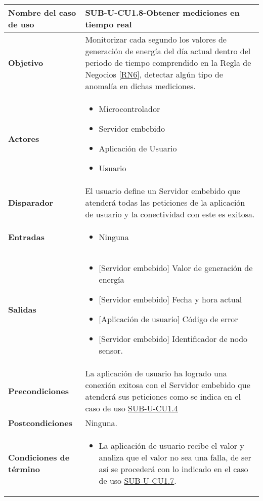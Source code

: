 \begin{longtable}{|J{5cm}|J{10.3cm}|}
	\hline
	\textbf{Nombre del caso de uso} &
		SUB-U-CU1.8-Obtener mediciones en tiempo real \\ \hline
	\textbf{Objetivo} &
		Monitorizar cada segundo los valores de generación de energía del día actual dentro del periodo de tiempo comprendido en la Regla de Negocios \ref{RN6}, detectar algún tipo de anomalía en dichas mediciones. \\ \hline
	\textbf{Actores} &
		\begin{itemize}
		    \item Microcontrolador
			\item Servidor embebido
			\item Aplicación de Usuario
		    \item Usuario
		\end{itemize} \\ \hline
	\textbf{Disparador} & 
	    El usuario define un Servidor embebido que atenderá todas las peticiones de la aplicación de usuario y la conectividad con este es exitosa.\\ \hline 
	\textbf{Entradas} & 
		\begin{itemize}
				\item Ninguna
		\end{itemize}\\ \hline 
	\textbf{Salidas} & 
		\begin{itemize}
			\item{[Servidor embebido]} Valor de generación de energía
			\item{[Servidor embebido]} Fecha y hora actual
			\item{[Aplicación de usuario]} Código de error
			\item{[Servidor embebido]} Identificador de nodo sensor.
		\end{itemize} \\ \hline
	\textbf{Precondiciones} &
		La aplicación de usuario ha logrado una conexión exitosa con el Servidor embebido que atenderá sus peticiones como se indica en el caso de uso \hyperref[SUB-U-CU1.4]{SUB-U-CU1.4} \\ \hline
	\textbf{Postcondiciones} &
		Ninguna.\\ \hline
	\textbf{Condiciones de término} & 
		\begin{itemize}
			\item La aplicación de usuario recibe el valor y analiza que el valor no sea una falla, de ser así se procederá con lo indicado en el caso de uso \hyperref[SUB-U-CU1.7]{SUB-U-CU1.7}.

\end{itemize}
\end{longtable}
